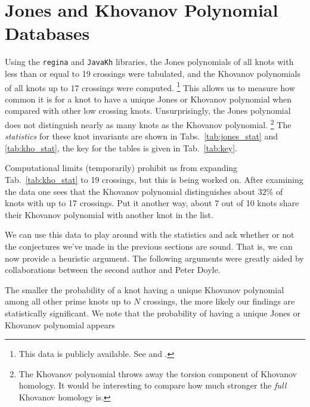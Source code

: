 \documentclass{article}
\theoremstyle{plain}
\begin{document}
    \section{Jones and Khovanov Polynomial Databases}
        Using the \texttt{regina} and \texttt{JavaKh} libraries, the Jones
        polynomials of all knots with less than or equal to 19 crossings were
        tabulated, and the Khovanov polynomials of all knots up to 17 crossings
        were computed.%
        \footnote{%
            This data is publicly available. See
            \cite{JonesData} and \cite{KhovanovData}.
        }
        This allows us to measure how common it is for a knot
        to have a unique Jones or Khovanov polynomial when compared with other
        low crossing knots. Unsurprisingly, the Jones polynomial does not
        distinguish nearly as many knots as the Khovanov polynomial.%
        \footnote{%
            The Khovanov polynomial throws away the torsion component of
            Khovanov homology. It would be interesting to compare how much
            stronger the \textit{full} Khovanov homology is.
        }
        The \textit{statistics} for these knot invariants are shown in
        Tabs.~\ref{tab:jones_stat} and \ref{tab:kho_stat}, the key for the
        tables is given in Tab.~\ref{tab:key}.
        \par\hfill\par
        Computational limits (temporarily) prohibit us from expanding
        Tab.~\ref{tab:kho_stat} to 19 crossings, but this is being worked on.
        After examining the data one sees that the Khovanov polynomial
        distinguishes about $32\%$ of knots with up to 17 crossings. Put it
        another way, about 7 out of 10 knots share their Khovanov polynomial
        with another knot in the list.
        \par\hfill\par
        We can use this data to play around with the statistics and ask whether or
        not the conjectures we've made in the previous sections are sound. That is,
        we can now provide a heuristic argument. The following arguments were
        greatly aided by collaborations between the second author and
        Peter Doyle.
        \par\hfill\par
        The smaller the probability of a knot having a unique Khovanov
        polynomial among all other prime knots up to $N$ crossings, the
        more likely our findings are statistically significant. We note that
        the probability of having a unique Jones or Khovanov polynomial appears
\end{document}
